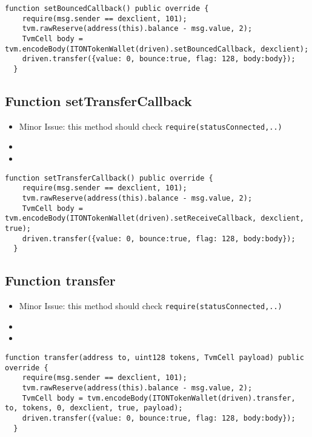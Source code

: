 \begin{lstlisting}[firstnumber=95]
  function setBouncedCallback() public override {
    require(msg.sender == dexclient, 101);
    tvm.rawReserve(address(this).balance - msg.value, 2);
    TvmCell body = tvm.encodeBody(ITONTokenWallet(driven).setBouncedCallback, dexclient);
    driven.transfer({value: 0, bounce:true, flag: 128, body:body});
  }
\end{lstlisting}

\subsection{Function setTransferCallback}

\begin{itemize}
\item Minor Issue: this method should check {\tt require(statusConnected,..)}
\item \issueError{}
\item \issueEncodeBody{}
\end{itemize}



\begin{lstlisting}[firstnumber=87]
  function setTransferCallback() public override {
    require(msg.sender == dexclient, 101);
    tvm.rawReserve(address(this).balance - msg.value, 2);
    TvmCell body = tvm.encodeBody(ITONTokenWallet(driven).setReceiveCallback, dexclient, true);
    driven.transfer({value: 0, bounce:true, flag: 128, body:body});
  }
\end{lstlisting}

\subsection{Function transfer}


\begin{itemize}
\item Minor Issue: this method should check {\tt require(statusConnected,..)}
\item \issueError{}
\item \issueEncodeBody{}
\end{itemize}



\begin{lstlisting}[firstnumber=108]
  function transfer(address to, uint128 tokens, TvmCell payload) public override {
    require(msg.sender == dexclient, 101);
    tvm.rawReserve(address(this).balance - msg.value, 2);
    TvmCell body = tvm.encodeBody(ITONTokenWallet(driven).transfer, to, tokens, 0, dexclient, true, payload);
    driven.transfer({value: 0, bounce:true, flag: 128, body:body});
  }
\end{lstlisting}

